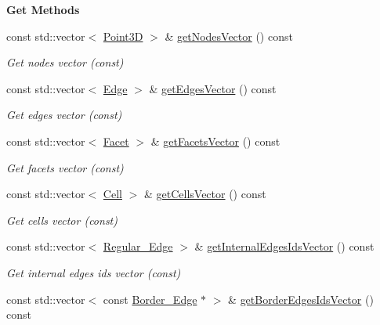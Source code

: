 \begin{Indent}{\bf Get Methods}\par
\begin{DoxyCompactItemize}
\item 
const std\+::vector$<$ \hyperlink{classFVCode3D_1_1Point3D}{Point3D} $>$ \& \hyperlink{classFVCode3D_1_1Rigid__Mesh_a7acee1523c8da4596273627acc652609}{get\+Nodes\+Vector} () const 
\begin{DoxyCompactList}\small\item\em Get nodes vector (const) \end{DoxyCompactList}\item 
const std\+::vector$<$ \hyperlink{classFVCode3D_1_1Rigid__Mesh_1_1Edge}{Edge} $>$ \& \hyperlink{classFVCode3D_1_1Rigid__Mesh_a807a6932cb5b80eb73bf86c3dae06a80}{get\+Edges\+Vector} () const 
\begin{DoxyCompactList}\small\item\em Get edges vector (const) \end{DoxyCompactList}\item 
const std\+::vector$<$ \hyperlink{classFVCode3D_1_1Rigid__Mesh_1_1Facet}{Facet} $>$ \& \hyperlink{classFVCode3D_1_1Rigid__Mesh_a6d3cdd4ef8a5225599953179d5302636}{get\+Facets\+Vector} () const 
\begin{DoxyCompactList}\small\item\em Get facets vector (const) \end{DoxyCompactList}\item 
const std\+::vector$<$ \hyperlink{classFVCode3D_1_1Rigid__Mesh_1_1Cell}{Cell} $>$ \& \hyperlink{classFVCode3D_1_1Rigid__Mesh_afefb62f2c37317402b495e2369ed495b}{get\+Cells\+Vector} () const 
\begin{DoxyCompactList}\small\item\em Get cells vector (const) \end{DoxyCompactList}\item 
const std\+::vector$<$ \hyperlink{classFVCode3D_1_1Rigid__Mesh_1_1Regular__Edge}{Regular\+\_\+\+Edge} $>$ \& \hyperlink{classFVCode3D_1_1Rigid__Mesh_aa6978e883bc7ef09478a0c85c25fabb2}{get\+Internal\+Edges\+Ids\+Vector} () const 
\begin{DoxyCompactList}\small\item\em Get internal edges ids vector (const) \end{DoxyCompactList}\item 
const std\+::vector$<$ const \hyperlink{classFVCode3D_1_1Rigid__Mesh_1_1Border__Edge}{Border\+\_\+\+Edge} $\ast$ $>$ \& \hyperlink{classFVCode3D_1_1Rigid__Mesh_a15ebdbb80648a2bd78b551ab02699ec8}{get\+Border\+Edges\+Ids\+Vector} () const 

\end{DoxyCompactItemize}
\end{Indent}
